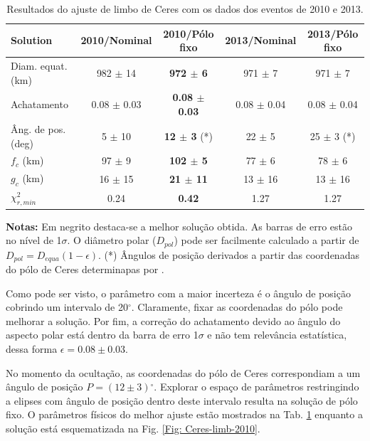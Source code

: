 \documentclass[12pt,a4paper]{monografia}
\newcommand{\degr}{\ensuremath{^{\circ}}}%
\begin{document}
\begin{table}[h]
 \begin{centering}
  \caption{Resultados do ajuste de limbo de Ceres com os dados dos eventos de 2010 e 2013.\label{Tab: resultados}}
  \begin{tabular}{@{}lcccc}
  \hline
     Solution & 2010/Nominal & \textbf{2010/Pólo fixo} & 2013/Nominal & 2013/Pólo fixo \\
\hline
Diam. equat.  (km) & 982 $\pm$ 14 & \textbf{972 $\pm$ 6}  & 971 $\pm$ 7  & 971 $\pm$ 7\\
Achatamento        & 0.08 $\pm$ 0.03 & \textbf{0.08 $\pm$ 0.03} & 0.08 $\pm$ 0.04 & 0.08 $\pm$ 0.04\\
Âng. de pos. (deg)   & 5 $\pm$ 10    & \textbf{12 $\pm$ 3} (*)& 22 $\pm$ 5    & 25 $\pm$ 3 (*)\\
$f_c$ (km)             & 97 $\pm$ 9   & \textbf{102 $\pm$ 5}   & 77 $\pm$ 6    & 78 $\pm$ 6\\
$g_c$ (km)             & 16 $\pm$ 15  & \textbf{21 $\pm$ 11}  & 13 $\pm$ 16   & 13 $\pm$ 16\\
$\chi^2_{r,min}$       & 0.24          &  \textbf{0.42}         & 1.27          & 1.27\\
\hline
\end{tabular}
\textbf{Notas:} Em negrito destaca-se a melhor solução obtida. As barras de erro estão no nível de 1$\sigma$. O diâmetro polar ($D_{pol}$) pode ser facilmente calculado a partir de $D_{pol}=D_{equa}(1 - \epsilon)$. (*) Ângulos de posição derivados a partir das coordenadas do pólo de Ceres determinapas por \cite{Drummond2014}.
\end{centering}
\end{table}

Como pode ser visto, o parâmetro com a maior incerteza é o ângulo de posição cobrindo um intervalo de 20$\degr$. Claramente, fixar as coordenadas do pólo pode melhorar a solução. Por fim, a correção do achatamento devido ao ângulo do aspecto polar está dentro da barra de erro 1$\sigma$ e não tem relevância estatística, dessa forma $\epsilon = 0.08 \pm 0.03$.

No momento da ocultação, as coordenadas do pólo de Ceres correspondiam a um ângulo de posição $P = (12 \pm 3)\degr$. Explorar o espaço de parâmetros restringindo a elipses com ângulo de posição dentro deste intervalo resulta na solução de pólo fixo. O parâmetros físicos do melhor ajuste estão mostrados na Tab. \ref{Tab: resultados} enquanto a solução está esquematizada na Fig. \ref{Fig: Ceres-limb-2010}.
\end{document}
